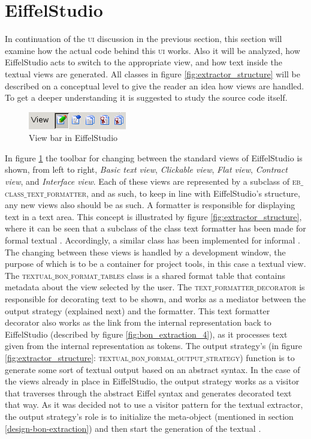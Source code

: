 \section{EiffelStudio}
\label{implementation_eiffelstudio}
In continuation of the \textsc{ui} discussion in the previous section, this section will examine how the actual code behind this \textsc{ui} works. Also it will be analyzed, how EiffelStudio acts to switch to the appropriate view, and how text inside the textual views are generated. All classes in figure \ref{fig:extractor_structure} will be described on a conceptual level to give the reader an idea how views are handled. To get a deeper understanding it is suggested to study the source code itself.

\begin{figure}[H]
\centering
\includegraphics[scale=0.8]{images/es0.png}
\caption{View bar in EiffelStudio}
\label{fig:EiffelStudio0}
\end{figure}

In figure \ref{fig:EiffelStudio0} the toolbar for changing between the standard views of EiffelStudio is shown, from left to right, \textit{Basic text view}, \textit{Clickable view}, \textit{Flat view}, \textit{Contract view}, and \textit{Interface view}. Each of these views are represented by a subclass of \textsc{eb$\_$class$\_$text$\_$formatter}, and as such, to keep in line with EiffelStudio's structure, any new views also should be as such. A formatter is responsible for displaying text in a text area. This concept is illustrated by figure \ref{fig:extractor_structure}, where it can be seen that a subclass of the class text formatter has been made for formal textual \bon. Accordingly, a similar class has been implemented for informal \bon{}. The changing between these views is handled by a development window, the purpose of which is to be a container for project tools, in this case a textual view. The \textsc{textual$\_$bon$\_$format$\_$tables} class is a shared format table that contains metadata about the view selected by the user. The \textsc{text$\_$formatter$\_$decorator} is responsible for decorating text to be shown, and works as a mediator between the output strategy (explained next) and the formatter. This text formatter decorator also works as the link from the internal representation back to EiffelStudio (described by figure \ref{fig:bon_extraction_4}), as it processes text given from the internal \bon{} representation as tokens. The output strategy's (in figure \ref{fig:extractor_structure}: \textsc{textual$\_$bon$\_$formal$\_$output$\_$strategy}) function is to generate some sort of textual output based on an abstract syntax. In the case of the views already in place in EiffelStudio, the output strategy works as a visitor that traverses through the abstract Eiffel syntax and generates decorated text that way. As it was decided not to use a visitor pattern for the textual \bon{} extractor, the output strategy's role is to initialize the meta-object (mentioned in section \ref{design-bon-extraction}) and then start the generation of the textual \bon.

